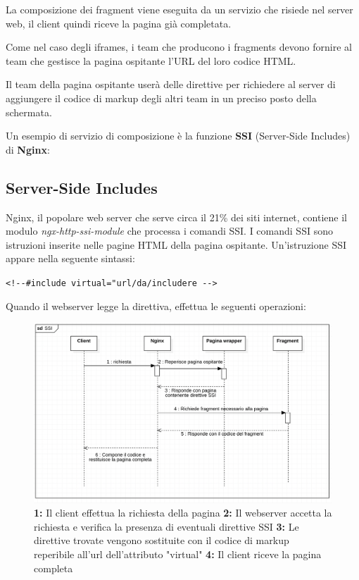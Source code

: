 La composizione dei fragment viene eseguita da un servizio che risiede nel server web, il client quindi riceve la pagina già completata.

Come nel caso degli iframes, i team che producono i fragments devono 
fornire al team che gestisce la pagina ospitante l'URL del loro codice HTML.

Il team della pagina ospitante userà delle direttive 
per richiedere al server di aggiungere il codice di markup degli altri team in un preciso posto della schermata.

Un esempio di servizio di composizione è la funzione \textbf{SSI} (Server-Side Includes) di \textbf{Nginx}:

\subsection{Server-Side Includes}

Nginx, il popolare web server che serve circa il 21\% dei siti internet\cite{nginx}, contiene il modulo \emph{ngx-http-ssi-module} che processa i comandi SSI.
 I comandi SSI sono istruzioni
inserite nelle pagine HTML della pagina ospitante. Un'istruzione SSI appare nella seguente sintassi:

   \begin{center}
    \verb|<!--#include virtual="url/da/includere -->|
   \end{center}

Quando il webserver legge la direttiva, effettua le seguenti operazioni:

\begin{figure}[H]
    \centering
    \includegraphics[width=140mm]{img/SSI sequence}
    \caption{ 
    \textbf{1:} Il client effettua la richiesta della pagina
    \textbf{2:} Il webserver accetta la richiesta e verifica la presenza di eventuali direttive SSI
    \textbf{3:} Le direttive trovate vengono sostituite con il codice di markup reperibile all'url dell'attributo "virtual"
    \textbf{4:} Il client riceve la pagina completa
    }
  \end{figure}


